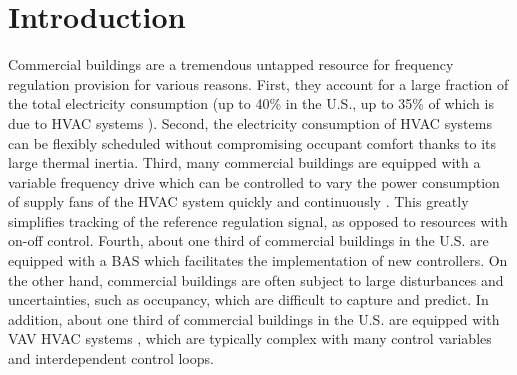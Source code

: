 %



\section{Introduction}\label{sec:introduction}

%

Commercial buildings are a tremendous untapped resource for frequency regulation provision for various reasons.
First, they account for a large fraction of the total electricity consumption (up to 40\% in the U.S., up to 35\% of which is due to HVAC systems \cite{USenergy:2017}). 
Second, the electricity consumption of HVAC systems can be flexibly scheduled without compromising occupant comfort thanks to its large thermal inertia.
Third, many commercial buildings are equipped with a variable frequency drive which can be controlled to vary the power consumption of supply fans of the HVAC system quickly and continuously \cite{Hao:2012demandresponse}. This greatly simplifies tracking of the reference regulation signal, as opposed to resources with on-off control.
Fourth, about one third of commercial buildings in the U.S. are equipped with a BAS \cite{Braun:2012} which facilitates the implementation of new controllers.
On the other hand, commercial buildings are often subject to large disturbances and uncertainties, such as occupancy, which are difficult to capture and predict. %
In addition, about one third of commercial buildings in the U.S. are equipped with VAV HVAC systems \cite{Hao:2012demandresponse}, which are typically complex with many control variables and interdependent control loops.


